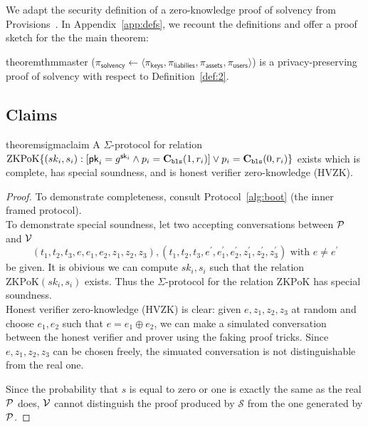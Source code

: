 We adapt the security definition of a zero-knowledge proof of solvency from Provisions~\cite{provisions}. In Appendix~\ref{app:defs}, we recount the definitions and offer a proof sketch for the the main theorem:

\begin{restatable}{theorem}{thmmaster}
\label{thm:master}
\Sys ($\pi_\mathsf{solvency}\leftarrow\langle \pi_\mathsf{keys}, \pi_\mathsf{liabilies}, \pi_\mathsf{assets}, \pi_\mathsf{users} \rangle$) is a privacy-preserving proof of solvency with respect to Definition~\ref{def:2}. 
\end{restatable}


\subsection{Claims}
\label{sec:claims}


\begin{restatable}{theorem}{sigmaclaim}
\label{thm:sigmaclaim}
A $\Sigma$-protocol for relation $\mathrm{ZKPoK} \{ (sk_i,s_i) :  [\mathsf{pk}_i=g^{\mathsf{sk}_i} \land p_i=\textbf{C}_\texttt{bls}(1,r_i)  ] \lor p_i=\textbf{C}_\texttt{bls}(0,r_i) \}$ exists which is complete, has special soundness, and is honest verifier zero-knowledge (HVZK).
\end{restatable}

\begin{proof}

To demonstrate completeness, consult Protocol~\ref{alg:boot} (the inner framed protocol). \\
To demonstrate special soundness, let two accepting conversations between $\mathcal{P}$ and $\mathcal{V}$
$$
(t_1,t_2,t_3,e,e_1,e_2,z_1,z_2,z_3),(t_1,t_2,t_3,e^\prime,e_1^\prime,e_2^\prime,z_1^\prime,z_2^\prime,z_3^\prime)\text{ with $e\ne{e^\prime}$}
$$
be given. It is obivious we can compute $sk_i,s_i$ such that the relation $\mathrm{ZKPoK}(sk_i,s_i)$ exists. Thus the $\Sigma$-protocol for the relation $\mathrm{ZKPoK}$ has special soundness. \\
Honest verifier zero-knowledge (HVZK) is clear: given $e,z_1,z_2,z_3$ at random and choose $e_1,e_2$ such that $e=e_1\oplus{e_2}$, we can make a simulated conversation between the honest verifier and prover using the faking proof tricks. Since $e,z_1,z_2,z_3$ can be chosen freely, the simuated conversation is not distinguishable from the real one.

Since the probability that $s$ is equal to zero or one is exactly the same as the real $\mathcal{P}$ does, $\mathcal{V}$ cannot distinguish the proof produced by $\mathcal{S}$ from the one generated by $\mathcal{P}$. \end{proof}


